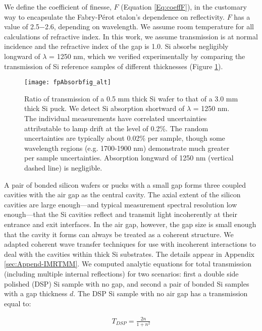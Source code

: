 \documentclass[osajnl,twocolumn,showpacs,superscriptaddress,11pt]{revtex4-1} %
\begin{document}
We define the coefficient of finesse\cite{2007fuph.book.....S}, $F$ (Equation \ref{Eq:coeffF}), in the customary way to encapsulate the Fabry-P\'{e}rot etalon's dependence on reflectivity.  $F$ has a value of 2.5$-$2.6, depending on wavelength.  We assume room temperature for all calculations of refractive index.  In this work, we assume transmission is at normal incidence and the refractive index of the gap is 1.0.  Si absorbs negligibly longward of $\lambda$ = 1250 nm, which we verified experimentally by comparing the transmission of Si reference samples of different thicknesses (Figure \ref{figSiAbsorbfig}).

\begin{figure}[!htbp]
\texttt{[image: fpAbsorbfig\_alt]}
\caption{Ratio of transmission of a 0.5 mm thick Si wafer to that of a 3.0 mm thick Si puck.  \label{figSiAbsorbfig} We detect Si absorption shortward of $\lambda$ = 1250 nm.  The individual measurements have correlated uncertainties attributable to lamp drift at the level of 0.2\%.  The random uncertainties are typically about 0.02\% per sample, though some wavelength regions (e.g. 1700-1900 nm) demonstrate much greater per sample uncertainties.  Absorption longward of 1250 nm (vertical dashed line) is negligible.}
\end{figure}

A pair of bonded silicon wafers or pucks with a small gap forms three coupled cavities with the air gap as the central cavity.  The axial extent of the silicon cavities are large enough---and typical measurement spectral resolution low enough---that the Si cavities reflect and transmit light incoherently at their entrance and exit interfaces.  In the air gap, however, the gap size is small enough that the cavity it forms can always be treated as a coherent structure.  We adapted coherent wave transfer techniques \cite{2007fuph.book.....S} for use with incoherent interactions \cite{2002ApOpt..41.3978K} to deal with the cavities within thick Si substrates.  The details appear in Appendix \ref{sec:Append-IMRTMM}.  We computed analytic equations for total transmission (including multiple internal reflections) for two scenarios: first a double side polished (DSP) Si sample with no gap, and second a pair of bonded Si samples with a gap thickness $d$.  The DSP Si sample with no air gap has a transmission equal to:

\begin{eqnarray}
T_{DSP} = \frac{2n}{1+n^2} \label{eqnAbsDSPtrans}
\end{eqnarray}
\end{document}
